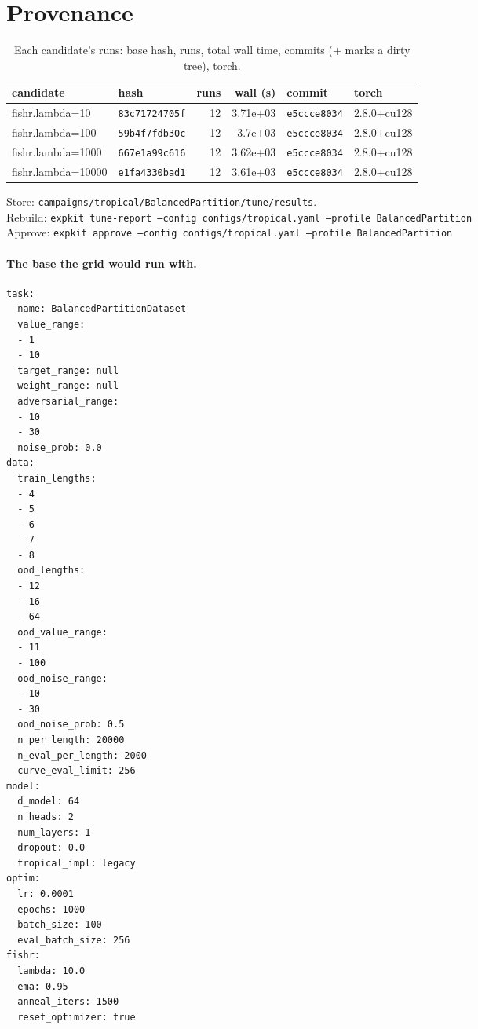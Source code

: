 \documentclass[10pt]{article}
\begin{document}
\section{Provenance}
{\small
\begin{longtable}{llrrll}
\caption{Each candidate's runs: base hash, runs, total wall time, commits (+ marks a dirty tree), torch.}\label{tab:provenance}\\
\toprule
candidate & hash & runs & wall (s) & commit & torch\\
\midrule
\endhead
fishr.lambda=10 & \texttt{83c71724705f} & 12 & 3.71e+03 & \texttt{e5ccce8034} & 2.8.0+cu128\\
fishr.lambda=100 & \texttt{59b4f7fdb30c} & 12 & 3.7e+03 & \texttt{e5ccce8034} & 2.8.0+cu128\\
fishr.lambda=1000 & \texttt{667e1a99c616} & 12 & 3.62e+03 & \texttt{e5ccce8034} & 2.8.0+cu128\\
fishr.lambda=10000 & \texttt{e1fa4330bad1} & 12 & 3.61e+03 & \texttt{e5ccce8034} & 2.8.0+cu128\\
\bottomrule
\end{longtable}
}
\noindent Store: \texttt{campaigns/tropical/BalancedPartition/tune/results}.\\
Rebuild: \texttt{expkit tune-report --config configs/tropical.yaml --profile BalancedPartition}\\
Approve: \texttt{expkit approve --config configs/tropical.yaml --profile BalancedPartition}

\paragraph{The base the grid would run with.}
{\footnotesize
\begin{verbatim}
task:
  name: BalancedPartitionDataset
  value_range:
  - 1
  - 10
  target_range: null
  weight_range: null
  adversarial_range:
  - 10
  - 30
  noise_prob: 0.0
data:
  train_lengths:
  - 4
  - 5
  - 6
  - 7
  - 8
  ood_lengths:
  - 12
  - 16
  - 64
  ood_value_range:
  - 11
  - 100
  ood_noise_range:
  - 10
  - 30
  ood_noise_prob: 0.5
  n_per_length: 20000
  n_eval_per_length: 2000
  curve_eval_limit: 256
model:
  d_model: 64
  n_heads: 2
  num_layers: 1
  dropout: 0.0
  tropical_impl: legacy
optim:
  lr: 0.0001
  epochs: 1000
  batch_size: 100
  eval_batch_size: 256
fishr:
  lambda: 10.0
  ema: 0.95
  anneal_iters: 1500
  reset_optimizer: true
\end{verbatim}
}

\clearpage
\appendix
\end{document}
